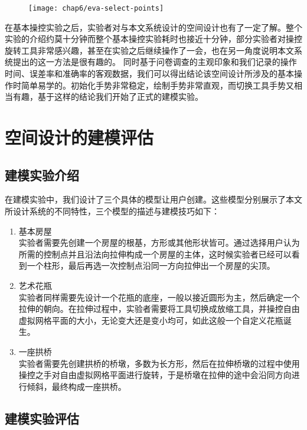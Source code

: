 \begin{figure}[!htp]
  \centering
  \texttt{[image: chap6/eva-select-points]}
\end{figure}

在基本操控实验之后，实验者对与本文系统设计的空间设计也有了一定了解。整个实验的介绍约莫十分钟而整个基本操控实验耗时也接近十分钟，部分实验者对操控旋转工具非常感兴趣，甚至在实验之后继续操作了一会，也在另一角度说明本文系统提出的这一方法是很有趣的。
同时基于问卷调查的主观印象和我们记录的操作时间、误差率和准确率的客观数据，我们可以得出结论该空间设计所涉及的基本操作时简单易学的。初始化手势非常稳定，绘制手势非常直观，而切换工具手势又相当有趣，基于这样的结论我们开始了正式的建模实验。

\section{空间设计的建模评估}
\label{sec:exp:model}

\subsection{建模实验介绍}
在建模实验中，我们设计了三个具体的模型让用户创建。这些模型分别展示了本文所设计系统的不同特性，三个模型的描述与建模技巧如下：

\begin{enumerate}
\item 基本房屋\hfill\\ 实验者需要先创建一个房屋的根基，方形或其他形状皆可。通过选择用户认为所需的控制点并且沿法向拉伸构成一个房屋的主体，这时候实验者已经可以看到一个柱形，最后再选一次控制点沿同一方向拉伸出一个房屋的尖顶。
\item 艺术花瓶\hfill\\ 实验者同样需要先设计一个花瓶的底座，一般以接近圆形为主，然后确定一个拉伸的朝向。在拉伸过程中，实验者需要将工具切换成放缩工具，并操控自由虚拟网格平面的大小，无论变大还是变小均可，如此这般一个自定义花瓶诞生。
\item 一座拱桥\hfill\\ 实验者需要先创建拱桥的桥墩，多数为长方形，然后在拉伸桥墩的过程中使用操控之手对自由虚拟网格平面进行旋转，于是桥墩在拉伸的途中会沿同方向进行倾斜，最终构成一座拱桥。
\end{enumerate}

\subsection{建模实验评估}

